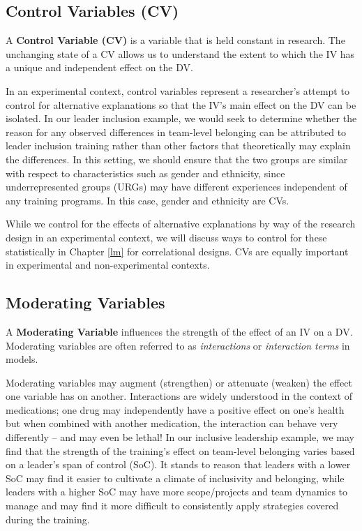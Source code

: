 \documentclass[
]{book}
\begin{document}
\hypertarget{control-variables-cv}{%
\subsection{Control Variables (CV)}\label{control-variables-cv}}

A \textbf{Control Variable (CV)} is a variable that is held constant in research. The unchanging state of a CV allows us to understand the extent to which the IV has a unique and independent effect on the DV.

In an experimental context, control variables represent a researcher's attempt to control for alternative explanations so that the IV's main effect on the DV can be isolated. In our leader inclusion example, we would seek to determine whether the reason for any observed differences in team-level belonging can be attributed to leader inclusion training rather than other factors that theoretically may explain the differences. In this setting, we should ensure that the two groups are similar with respect to characteristics such as gender and ethnicity, since underrepresented groups (URGs) may have different experiences independent of any training programs. In this case, gender and ethnicity are CVs.

While we control for the effects of alternative explanations by way of the research design in an experimental context, we will discuss ways to control for these statistically in Chapter \ref{lm} for correlational designs. CVs are equally important in experimental and non-experimental contexts.

\hypertarget{moderating-variables}{%
\subsection{Moderating Variables}\label{moderating-variables}}

A \textbf{Moderating Variable} influences the strength of the effect of an IV on a DV. Moderating variables are often referred to as \emph{interactions} or \emph{interaction terms} in models.

Moderating variables may augment (strengthen) or attenuate (weaken) the effect one variable has on another. Interactions are widely understood in the context of medications; one drug may independently have a positive effect on one's health but when combined with another medication, the interaction can behave very differently -- and may even be lethal! In our inclusive leadership example, we may find that the strength of the training's effect on team-level belonging varies based on a leader's span of control (SoC). It stands to reason that leaders with a lower SoC may find it easier to cultivate a climate of inclusivity and belonging, while leaders with a higher SoC may have more scope/projects and team dynamics to manage and may find it more difficult to consistently apply strategies covered during the training.
\end{document}
